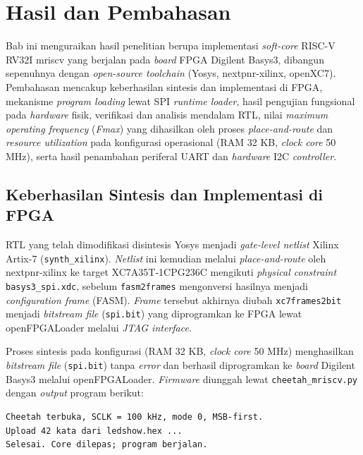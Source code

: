 \chapter{Hasil dan Pembahasan}

Bab ini menguraikan hasil penelitian berupa implementasi \textit{soft-core} RISC-V RV32I mriscv yang berjalan pada \textit{board} FPGA Digilent Basys3, dibangun sepenuhnya dengan \textit{open-source toolchain} (Yosys, nextpnr-xilinx, openXC7). Pembahasan mencakup keberhasilan sintesis dan implementasi di FPGA, mekanisme \textit{program loading} lewat SPI \textit{runtime loader}, hasil pengujian fungsional pada \textit{hardware} fisik, verifikasi dan analisis mendalam RTL, nilai \textit{maximum operating frequency} (\textit{Fmax}) yang dihasilkan oleh proses \textit{place-and-route} dan \textit{resource utilization} pada konfigurasi operasional (RAM 32 KB, \textit{clock core} 50 MHz), serta hasil penambahan periferal UART dan \textit{hardware} I2C \textit{controller}.

\section{Keberhasilan Sintesis dan Implementasi di FPGA}
\label{sec:sintesis-berhasil}

RTL yang telah dimodifikasi disintesis Yosys menjadi \textit{gate-level netlist} Xilinx Artix-7 (\texttt{synth\_xilinx}). \textit{Netlist} ini kemudian melalui \textit{place-and-route} oleh nextpnr-xilinx ke target XC7A35T-1CPG236C mengikuti \textit{physical constraint} \texttt{basys3\_spi.xdc}, sebelum \texttt{fasm2frames} mengonversi hasilnya menjadi \textit{configuration frame} (FASM). \textit{Frame} tersebut akhirnya diubah \texttt{xc7frames2bit} menjadi \textit{bitstream file} (\texttt{spi.bit}) yang diprogramkan ke FPGA lewat openFPGALoader melalui \textit{JTAG interface}.

Proses sintesis pada konfigurasi (RAM 32 KB, \textit{clock core} 50 MHz) menghasilkan \textit{bitstream file} (\texttt{spi.bit}) tanpa \textit{error} dan berhasil diprogramkan ke \textit{board} Digilent Basys3 melalui openFPGALoader. \textit{Firmware} diunggah lewat \texttt{cheetah\_mriscv.py} dengan \textit{output} program berikut:

\begin{verbatim}
Cheetah terbuka, SCLK = 100 kHz, mode 0, MSB-first.
Upload 42 kata dari ledshow.hex ...
Selesai. Core dilepas; program berjalan.
\end{verbatim}


